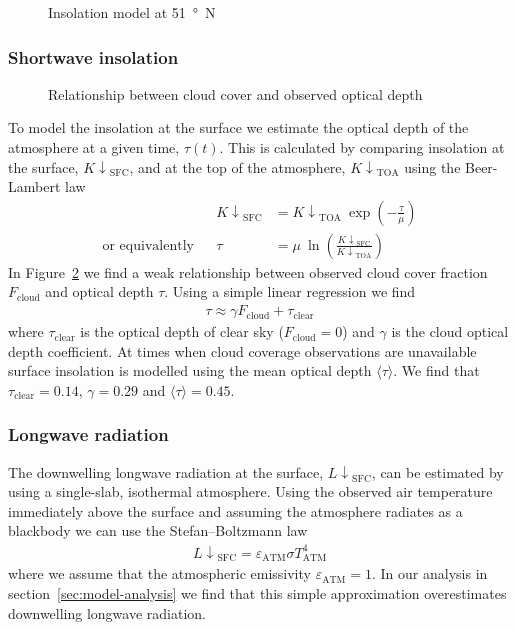 \documentclass[a4paper,titlepage]{article}
\newcommand\Kdownsfc{{K\!\!\downarrow}_\mathrm{SFC}}
\newcommand\Kdowntoa{{K\!\!\downarrow}_\mathrm{TOA}}
\newcommand\Ldownsfc{{L\!\!\downarrow}_\mathrm{SFC}}
\begin{document}
\begin{figure}
\centering

\caption{Insolation model at \SI{51}{\degree N}}
\label{fig:toa-model}
\end{figure}

\subsubsection{Shortwave insolation}
\begin{figure}
\centering

\caption{Relationship between cloud cover and observed optical depth}
\label{fig:cloud-tau-fit}
\end{figure}

To model the insolation at the surface we estimate the optical depth of the atmosphere at a given time, $\tau(t)$.  This is calculated by comparing insolation at the surface, $\Kdownsfc$, and at the top of the atmosphere, $\Kdowntoa$ using the Beer-Lambert law
\begin{align*}
&& \Kdownsfc &= \Kdowntoa\: \exp \left( -\frac{\tau}{\mu} \right) \\
\text{or equivalently} && \tau &= \mu \: \ln \left( \frac{\Kdownsfc}{\Kdowntoa} \right)
\end{align*}
In Figure~\ref{fig:cloud-tau-fit} we find a weak relationship between observed cloud cover fraction $F_\mathrm{cloud}$ and optical depth $\tau$.  Using a simple linear regression we find
\begin{align*}
\tau \approx \gamma F_\mathrm{cloud} + \tau_\mathrm{clear}
\end{align*}
where $\tau_\mathrm{clear}$ is the optical depth of clear sky ($F_\mathrm{cloud} = 0$) and $\gamma$ is the cloud optical depth coefficient.  At times when cloud coverage observations are unavailable surface insolation is modelled using the mean optical depth $\langle \tau \rangle$.  We find that $\tau_\mathrm{clear} = 0.14$, $\gamma =  0.29$ and $\langle \tau \rangle = 0.45$.

\subsubsection{Longwave radiation}
The downwelling longwave radiation at the surface, $\Ldownsfc$, can be estimated by using a single-slab, isothermal atmosphere.  Using the observed air temperature immediately above the surface and assuming the atmosphere radiates as a blackbody we can use the Stefan--Boltzmann law
\begin{align}
\Ldownsfc = \varepsilon_\mathrm{ATM} \sigma T_\mathrm{ATM}^4 \label{eq:stefan-boltzmann}
\end{align}
where we assume that the atmospheric emissivity $\varepsilon_\mathrm{ATM} = 1$.  In our analysis in section~\ref{sec:model-analysis} we find that this simple approximation overestimates downwelling longwave radiation.
\end{document}
